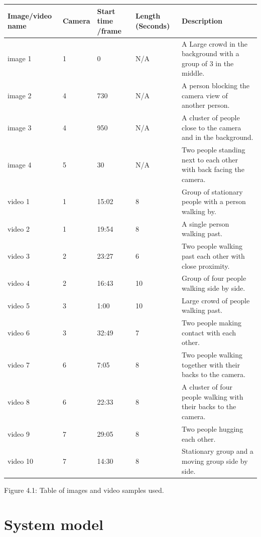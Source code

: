\documentclass[12pt]{report}
\begin{document}
\begin{center}
\footnotesize
	\begin{tabular}{|p{2.2cm}|l|p{1.8cm}|p{2cm}|p{5cm}|}
		\hline
		Image/video name & Camera & Start time /frame & Length (Seconds) & Description \\
		\hline
		image 1 & 1 & 0 & N/A & A Large crowd in the background with a group of 3 in the middle. \\
		\hline
		image 2 & 4 & 730 & N/A & A person blocking the camera view of another person. \\
		\hline
		image 3 & 4 & 950 & N/A & A cluster of people close to the camera and in the background. \\
		\hline
		image 4 & 5 & 30 & N/A & Two people standing next to each other with back facing the camera. \\
		\hline
		video 1 & 1 & 15:02 & 8 & Group of stationary people with a person walking by. \\
		\hline
		video 2 & 1 & 19:54 & 8 & A single person walking past. \\
		\hline
		video 3 & 2 & 23:27 & 6 & Two people walking past each other with close proximity. \\
		\hline
		video 4 & 2 & 16:43 & 10 & Group of four people walking side by side. \\
		\hline
		video 5 & 3 & 1:00 & 10 & Large crowd of people walking past. \\
		\hline
		video 6 & 3 & 32:49 & 7 & Two people making contact with each other. \\ 
		\hline
		video 7 & 6 & 7:05 & 8 & Two people walking together with their backs to the camera. \\
		\hline
		video 8 & 6 & 22:33 & 8 & A cluster of four people walking with their backs to the camera. \\
		\hline 
		video 9 & 7 & 29:05 & 8 & Two people hugging each other. \\
		\hline
		video 10 & 7 & 14:30 & 8 & Stationary group and a moving group side by side. \\
		\hline
	\end{tabular}
\vspace{4mm}

{Figure 4.1: Table of images and video samples used.}

\end{center}

\section{System model}
\end{document}
